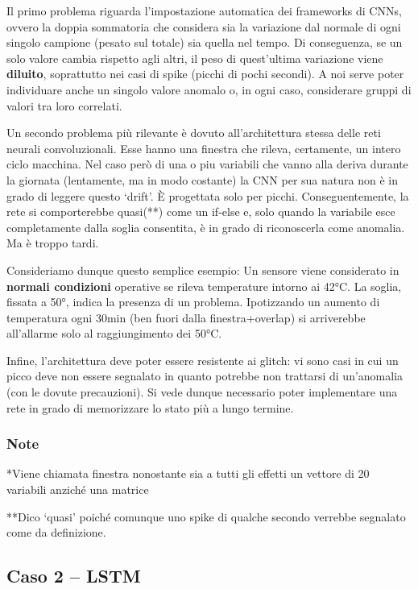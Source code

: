 Il primo problema riguarda l’impostazione automatica dei frameworks di CNNs, ovvero la doppia sommatoria che considera sia la variazione dal normale di ogni singolo campione (pesato sul totale) sia quella nel tempo. Di conseguenza, se un solo valore cambia rispetto agli altri, il peso di quest’ultima variazione viene \textbf{diluito}, soprattutto nei casi di spike (picchi di pochi secondi). A noi serve poter individuare anche un singolo valore anomalo o, in ogni caso, considerare gruppi di valori tra loro correlati.

Un secondo problema più rilevante è dovuto all’architettura stessa delle reti neurali convoluzionali. Esse hanno una finestra che rileva, certamente, un intero ciclo macchina. Nel caso però di una o piu variabili che vanno alla deriva durante la giornata (lentamente, ma in modo costante) la CNN per sua natura non è in grado di leggere questo ‘drift’. È progettata solo per picchi. Conseguentemente, la rete si comporterebbe quasi(**) come un if-else e, solo quando la variabile esce completamente dalla soglia consentita, è in grado di riconoscerla come anomalia. Ma è troppo tardi.

Consideriamo dunque questo semplice esempio:
Un sensore viene considerato in \textbf{normali condizioni} operative se rileva temperature intorno ai 42°C. La soglia, fissata a 50°, indica la presenza di un problema. Ipotizzando un aumento di temperatura ogni 30min (ben fuori dalla finestra+overlap) si arriverebbe all’allarme solo al raggiungimento dei 50°C. 

Infine, l’architettura deve poter essere resistente ai glitch: vi sono casi in cui un picco deve non essere segnalato in quanto potrebbe non trattarsi di un’anomalia (con le dovute precauzioni).
Si vede dunque necessario poter implementare una rete in grado di memorizzare lo stato più a lungo termine.

\subsubsection{Note}
*Viene chiamata finestra nonostante sia a tutti gli effetti un vettore di 20 variabili anziché una matrice

**Dico ‘quasi’ poiché comunque uno spike di qualche secondo verrebbe segnalato come da definizione.

\subsection{Caso 2 -- LSTM}

